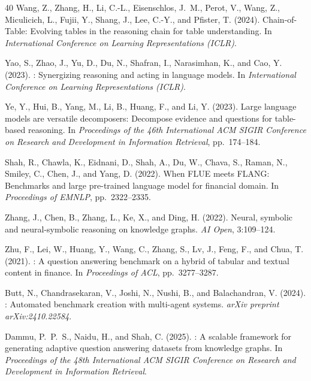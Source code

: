 \documentclass[11pt]{article}
\begin{document}
\begin{thebibliography}{40}
Wang, Z., Zhang, H., Li, C.-L., Eisenschlos, J.~M., Perot, V., Wang, Z.,
  Miculicich, L., Fujii, Y., Shang, J., Lee, C.-Y., and Pfister, T. (2024).
\newblock Chain-of-Table: Evolving tables in the reasoning chain for table
  understanding.
\newblock In \emph{International Conference on Learning Representations (ICLR)}.

Yao, S., Zhao, J., Yu, D., Du, N., Shafran, I., Narasimhan, K., and
  Cao, Y. (2023).
: Synergizing reasoning and acting in language models.
\newblock In \emph{International Conference on Learning Representations (ICLR)}.

Ye, Y., Hui, B., Yang, M., Li, B., Huang, F., and Li, Y. (2023).
\newblock Large language models are versatile decomposers: Decompose evidence
  and questions for table-based reasoning.
\newblock In \emph{Proceedings of the 46th International ACM SIGIR Conference
  on Research and Development in Information Retrieval}, pp.~174--184.

Shah, R., Chawla, K., Eidnani, D., Shah, A., Du, W., Chava, S., Raman, N.,
  Smiley, C., Chen, J., and Yang, D. (2022).
\newblock When {FLUE} meets {FLANG}: Benchmarks and large pre-trained language
  model for financial domain.
\newblock In \emph{Proceedings of EMNLP}, pp.~2322--2335.

Zhang, J., Chen, B., Zhang, L., Ke, X., and Ding, H. (2022).
\newblock Neural, symbolic and neural-symbolic reasoning on knowledge graphs.
\newblock \emph{AI Open}, 3:109--124.

Zhu, F., Lei, W., Huang, Y., Wang, C., Zhang, S., Lv, J., Feng, F., and
  Chua, T. (2021).
: A question answering benchmark on a hybrid of tabular and
  textual content in finance.
\newblock In \emph{Proceedings of ACL}, pp.~3277--3287.

Butt, N., Chandrasekaran, V., Joshi, N., Nushi, B., and
  Balachandran, V. (2024).
: Automated benchmark creation with multi-agent systems.
\newblock \emph{arXiv preprint arXiv:2410.22584}.

Dammu, P.~P.~S., Naidu, H., and Shah, C. (2025).
: A scalable framework for generating adaptive question
  answering datasets from knowledge graphs.
\newblock In \emph{Proceedings of the 48th International ACM SIGIR Conference
  on Research and Development in Information Retrieval}.


\end{thebibliography}
\end{document}
